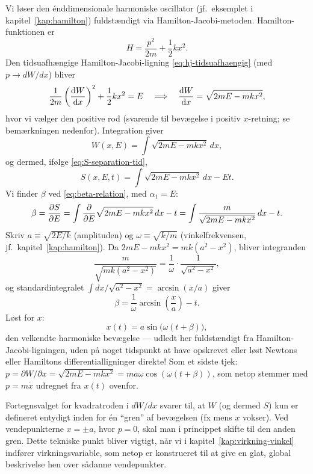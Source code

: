 \begin{eksempel}
Vi løser den énddimensionale harmoniske oscillator
(jf.\ eksemplet i kapitel~\ref{kap:hamilton}) fuldstændigt via
Hamilton-Jacobi-metoden. Hamilton-funktionen er
\begin{equation}
  H = \frac{p^2}{2m} + \frac12 kx^2.
\end{equation}
Den tidsuafhængige Hamilton-Jacobi-ligning \eqref{eq:hj-tidsuafhaengig}
(med $p\to dW/dx$) bliver
\begin{equation}
  \frac{1}{2m}\left(\dv{W}{x}\right)^2 + \frac12 kx^2 = E
  \quad\Longrightarrow\quad
  \dv{W}{x} = \sqrt{2mE - mkx^2},
\end{equation}
hvor vi vælger den positive rod (svarende til bevægelse i positiv
$x$-retning; se bemærkningen nedenfor). Integration giver
\begin{equation}
  W(x,E) = \int\sqrt{2mE-mkx^2}\,dx,
\end{equation}
og dermed, ifølge \eqref{eq:S-separation-tid},
\begin{equation}
  S(x,E,t) = \int\sqrt{2mE-mkx^2}\,dx - Et.
\end{equation}
Vi finder $\beta$ ved \eqref{eq:beta-relation}, med $\alpha_1=E$:
\begin{equation}
  \beta = \pdv{S}{E} = \int\pdv{E}\sqrt{2mE-mkx^2}\,dx - t
        = \int\frac{m}{\sqrt{2mE-mkx^2}}\,dx - t.
\end{equation}
Skriv $a\equiv\sqrt{2E/k}$ (amplituden) og $\omega\equiv\sqrt{k/m}$
(vinkelfrekvensen, jf.\ kapitel~\ref{kap:hamilton}). Da
$2mE-mkx^2=mk(a^2-x^2)$, bliver integranden
\begin{equation}
  \frac{m}{\sqrt{mk(a^2-x^2)}} = \frac{1}{\omega}\cdot\frac{1}{\sqrt{a^2-x^2}},
\end{equation}
og standardintegralet $\int dx/\sqrt{a^2-x^2}=\arcsin(x/a)$ giver
\begin{equation}
  \beta = \frac{1}{\omega}\arcsin\left(\frac{x}{a}\right) - t.
\end{equation}
Løst for $x$:
\begin{equation}
  \boxed{x(t) = a\sin\bigl(\omega(t+\beta)\bigr),}
\end{equation}
den velkendte harmoniske bevægelse — udledt her fuldstændigt fra
Hamilton-Jacobi-ligningen, uden på noget tidspunkt at have opskrevet
eller løst Newtons eller Hamiltons differentialligninger direkte! Som
et sidste tjek: $p=\partial W/\partial x=\sqrt{2mE-mkx^2}=m a\omega\cos(\omega(t+\beta))$,
som netop stemmer med $p=m\dot x$ udregnet fra $x(t)$ ovenfor.

\begin{bemaerkning}
Fortegnsvalget for kvadratroden i $dW/dx$ svarer til, at $W$ (og dermed
$S$) kun er defineret entydigt inden for én ``gren'' af bevægelsen (fx
mens $x$ vokser). Ved vendepunkterne $x=\pm a$, hvor $p=0$, skal man i
princippet skifte til den anden gren. Dette tekniske punkt bliver
vigtigt, når vi i kapitel~\ref{kap:virkning-vinkel} indfører
virkningsvariable, som netop er konstrueret til at give en glat,
global beskrivelse hen over sådanne vendepunkter.
\end{bemaerkning}
\end{eksempel}

